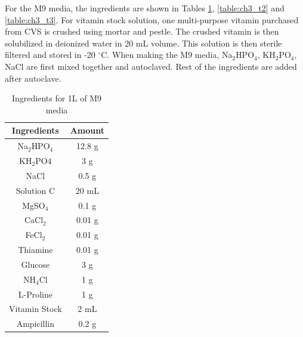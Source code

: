 For the M9 media, the ingredients are shown in Tables \ref{table:ch3_t1}, \ref{table:ch3_t2} and \ref{table:ch3_t3}. For vitamin stock solution, one multi-purpose vitamin purchased from CVS is crushed using mortar and pestle. The crushed vitamin is then solubilized in deionized water in 20 mL volume. This solution is then sterile filtered and stored in -20 $^{\circ}$C. When making the M9 media, Na$_{2}$HPO$_{4}$, KH$_{2}$PO$_{4}$, NaCl are first mixed together and autoclaved. Rest of the ingredients are added after autoclave.
\begin{table}[h]
\centering
	\caption{Ingredients for 1L of M9 media}
	\begin{tabular}{cc}
	\hline
	Ingredients & Amount \\
	\hline
	Na$_{2}$HPO$_{4}$     & 12.8 g  \\
	KH$_{2}$PO${4}$      & 3 g \\
	NaCl & 0.5 g \\
	Solution C & 20 mL \\
	MgSO$_{4}$ & 0.1 g \\
	CaCl$_{2}$ & 0.01 g \\
	FeCl$_{2}$ & 0.01 g \\
	Thiamine & 0.01 g \\
	Glucose & 3 g \\
	NH$_{4}$Cl & 1 g \\
	L-Proline & 1 g \\
	Vitamin Stock & 2 mL \\
	Ampicillin & 0.2 g \\
	\hline
	\end{tabular}
	\label{table:ch3_t1}
	\end{table}

